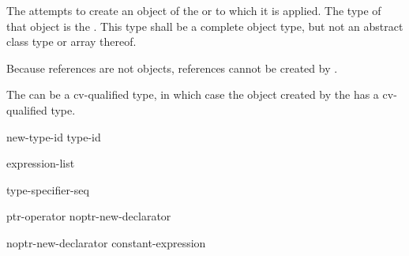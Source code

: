 \pnum
{}%
%
%
%
%
%
%
%
The  attempts to create an object of the
 or  to which
it is applied. The type of that object is the .
%
This type shall be a complete object type,
but not an abstract class type or array
thereof.
\begin{note}
Because references are not objects, references cannot be created by
.
\end{note}
\begin{note}
The  can be a cv-qualified type, in which case the
object created by the  has a cv-qualified type.
\end{note}

\begin{bnf}
\br
    \opt{\terminal{::}}   new-type-id  \br
    \opt{\terminal{::}}   \terminal{(} type-id \terminal{)} 
\end{bnf}

%
%
\begin{bnf}
\br
    \terminal{(} expression-list \terminal{)}
\end{bnf}

\begin{bnf}
\br
    type-specifier-seq 
\end{bnf}

\begin{bnf}
\br
    ptr-operator  \br
    noptr-new-declarator
\end{bnf}

\begin{bnf}
\br
    \terminal{[}  \terminal{]} \br
    noptr-new-declarator \terminal{[} constant-expression \terminal{]} 
\end{bnf}

